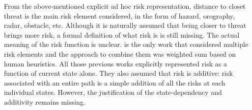 \documentclass[letterpaper]{article} %
\begin{document}


From the above-mentioned explicit ad hoc risk representation, distance to closet threat is the main risk element considered, in the form of hazard, orography, radar, obstacle, etc. Although it is naturally assumed that being closer to threat brings more risk, a formal definition of what risk is is still missing. The actual meaning of the risk function is unclear. \cite{soltani2004fuzzy} is the only work that considered multiple risk elements and the approach to combine them was weighted sum based on human heuristics. All those previous works explicitly represented risk as a function of current state alone. They also assumed that risk is additive: risk associated with an entire path is a simple addition of all the risks at each individual states. However, the justification of the state-dependency and additivity remains missing. 
\end{document}
